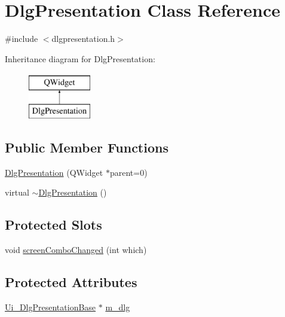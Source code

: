 \hypertarget{classDlgPresentation}{\section{Dlg\+Presentation Class Reference}
\label{classDlgPresentation}
}


{\ttfamily \#include $<$dlgpresentation.\+h$>$}

Inheritance diagram for Dlg\+Presentation\+:\begin{figure}[H]
\begin{center}
\leavevmode
\includegraphics[height=2.000000cm]{classDlgPresentation}
\end{center}
\end{figure}
\subsection*{Public Member Functions}
\begin{DoxyCompactItemize}
\item 
\hyperlink{classDlgPresentation_a9a05fbd1952a503fa7b2e74e1eb4c721}{Dlg\+Presentation} (Q\+Widget $\ast$parent=0)
\item 
virtual \hyperlink{classDlgPresentation_a9cecf68c7c1cf265806577f6f4e16a10}{$\sim$\+Dlg\+Presentation} ()
\end{DoxyCompactItemize}
\subsection*{Protected Slots}
\begin{DoxyCompactItemize}
\item 
void \hyperlink{classDlgPresentation_a510328bf08c98dc1d7f2fb408792fead}{screen\+Combo\+Changed} (int which)
\end{DoxyCompactItemize}
\subsection*{Protected Attributes}
\begin{DoxyCompactItemize}
\item 
\hyperlink{classUi__DlgPresentationBase}{Ui\+\_\+\+Dlg\+Presentation\+Base} $\ast$ \hyperlink{classDlgPresentation_a010a8c09c59fa2c78efd78b983e9c569}{m\+\_\+dlg}
\end{DoxyCompactItemize}


